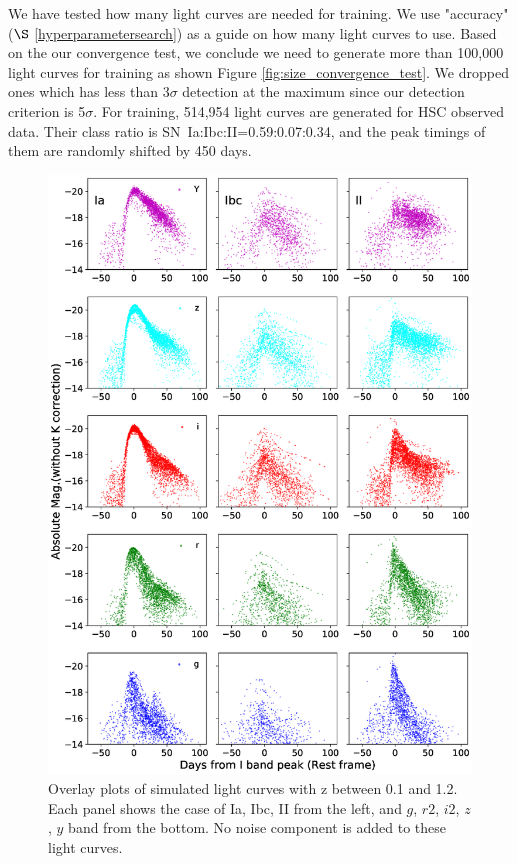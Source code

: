 \documentclass[useamsfonts]{pasj01}
\begin{document}
We have tested how many light curves are needed for training.  We use "accuracy" ($\S$ \ref{hyperparametersearch}) as a guide on how many light curves to use.  
Based on the our convergence test, we conclude we need to generate more than 100,000 light curves for training as shown Figure \ref{fig:size_convergence_test}.
We dropped ones which has less than 3$\sigma$ detection at the maximum since our detection criterion is 5$\sigma$.  %
For training, 514,954 light curves are generated for HSC observed data. 
Their class ratio is SN~Ia:Ibc:II=0.59:0.07:0.34, and the peak timings of them are randomly shifted by 450 days.
%
%
\begin{figure}[htbp]
  \begin{center}
     \includegraphics[width=\columnwidth]{figures/SimLCsamples.eps}
  \end{center}
  \vspace{-6mm}
  \caption{%
  Overlay plots of simulated light curves with z between 0.1 and 1.2.
  Each panel shows the case of Ia, Ibc, II from the left, and $g$, $r2$, $i2$, $z$, $y$ band from the bottom.
  No noise component is added to these light curves.
  }%
  
  \label{fig:simLCsamples}
\end{figure}
\end{document}
